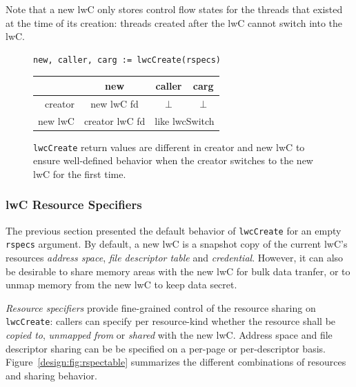 \documentclass[10pt,twocolumn,a4paper]{article}
\begin{document}
Note that a new lwC only stores control flow states for the threads that existed at the time of its creation:
threads created after the lwC cannot switch into the lwC.

\vspace{1.5em}
\begin{figure}[h]
  \centering
  \begin{framed}
\begin{lstlisting}[mathescape,aboveskip=0pt]
  new, caller, carg := lwcCreate(rspecs)
\end{lstlisting}
\begin{tabular}{|r||c|c|c|}
  \hline
                &   new        & caller       & carg \\
  \hline\hline
  creator       & new lwC fd   & $\bot$      & $\bot$\\
  \hline
  new lwC       &    creator lwC fd   & \multicolumn{2}{c|}{like lwcSwitch}\\
  \hline
\end{tabular}
\end{framed}
\caption{
  \texttt{lwcCreate} return values are different in creator and new lwC to ensure well-defined behavior when the creator switches to the new lwC for the first time.
  \label{design:fig:lwcCreate}
}
\end{figure}


\subsubsection{lwC Resource Specifiers}\label{design:rspecs}
The previous section presented the default behavior of \lstinline{lwcCreate} for an empty \lstinline{rspecs} argument.
By default, a new lwC is a snapshot copy of the current lwC's resources \textit{address space}, \textit{file descriptor table} and \textit{credential}.
However, it can also be desirable to share memory areas with the new lwC for bulk data tranfer, or to unmap memory from the new lwC to keep data secret.

\textit{Resource specifiers} provide fine-grained control of the resource sharing on \lstinline{lwcCreate}:
callers can specify per resource-kind whether the resource shall be \textit{copied to}, \textit{unmapped from} or \textit{shared} with the new lwC.
Address space and file descriptor sharing can be be specified on a per-page or per-descriptor basis.
Figure~\ref{design:fig:rspectable} summarizes the different combinations of resources and sharing behavior.
\cite{lwcpaper}
\end{document}
